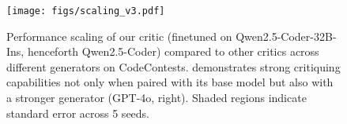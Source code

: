 \begin{figure}[t]
    \centering
    \texttt{[image: figs/scaling\_v3.pdf]}
    \vspace{-8mm}
    \caption{Performance scaling of our {\ours} critic (finetuned on Qwen2.5-Coder-32B-Ins, henceforth Qwen2.5-Coder) compared to other critics across different generators on CodeContests. {\ours} demonstrates strong critiquing capabilities not only when paired with its base model but also with a stronger generator (GPT-4o, right). Shaded regions indicate standard error across 5 seeds.
    \vspace{-3mm}
    }
    \label{fig:scaling}
\end{figure}
